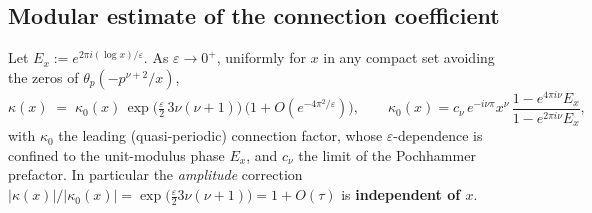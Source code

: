 \subsection{Modular estimate of the connection coefficient}
\begin{lemma}\label{lem:kappa}
Let $E_x:=e^{2\pi i(\log x)/\varepsilon}$. As $\varepsilon\to0^+$, uniformly for $x$ in any
compact set avoiding the zeros of $\theta_p(-p^{\nu+2}/x)$,
\begin{equation}\label{eq:kappa-asy}
   \kappa(x)\;=\;\kappa_0(x)\,\exp\!\Big(\tfrac{\varepsilon}{2}\,3\nu(\nu+1)\Big)\,
              \big(1+O(e^{-4\pi^2/\varepsilon})\big),
   \qquad
   \kappa_0(x)=c_\nu\,e^{-i\nu\pi}x^{\nu}\,
              \frac{1-e^{4\pi i\nu}E_x}{1-e^{2\pi i\nu}E_x},
\end{equation}
with $\kappa_0$ the leading (quasi-periodic) connection factor, whose $\varepsilon$-dependence
is confined to the unit-modulus phase $E_x$, and $c_\nu$ the limit of the Pochhammer
prefactor. In particular the \emph{amplitude} correction
$|\kappa(x)|/|\kappa_0(x)|=\exp\!\big(\tfrac{\varepsilon}{2}3\nu(\nu+1)\big)=1+O(\tau)$ is
\textbf{independent of $x$}.
\end{lemma}

